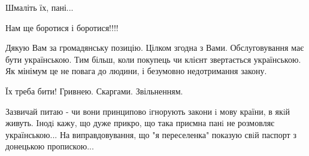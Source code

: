\begin{itemize}
 
Шмаліть їх, пані...

 
Нам ще боротися і боротися!!!!

 

Дякую Вам за громадянську позицію. Цілком згодна з Вами. Обслуговування має
бути українською. Тим більш, коли покупець чи клієнт звертається українською.
Як мінімум це не повага до людини, і безумовно недотримання закону.


 

Їх треба бити!
Гривнею.
Скаргами.
Звільненням.


 

Зазвичай питаю - чи вони принципово iгнорують закони i мову країни, в якiй
живуть. Iнодi кажу, що дуже прикро, що така приємна панi не розмовляє
українською... На виправдовування, що "я переселенка" показую свiй паспорт з
донецькою пропискою...

\begin{itemize}
 

\end{itemize}
\end{itemize}
